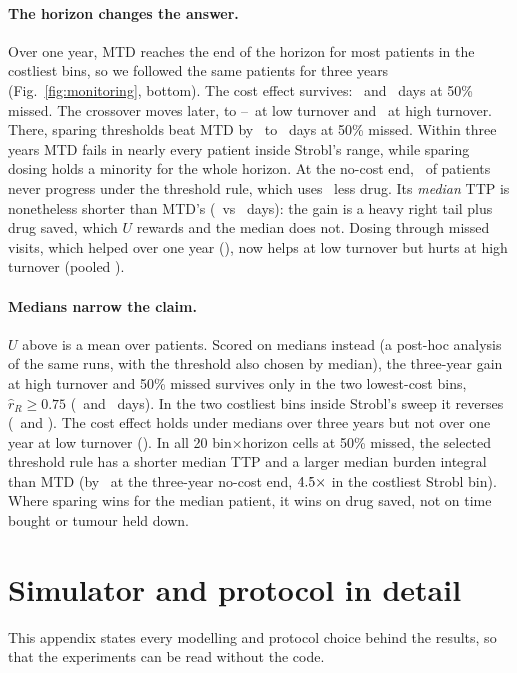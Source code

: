 \documentclass[10pt]{article}
\begin{document}
\paragraph{The horizon changes the answer.} Over one year, MTD reaches the end of
the horizon for most patients in the costliest bins, so we followed the same
patients for three years (Fig.~\ref{fig:monitoring}, bottom). The cost effect
survives: \MOneBCostLow\ and \MOneBCostHigh\ days at 50\% missed. The crossover
moves later, to \MOneBPStarLowMin--\MOneBPStarLowMax\ at low turnover and
\MOneBPStarHigh\ at high turnover. There, sparing thresholds beat MTD by
\MOneBHighMin\ to \MOneBHighMax\ days at 50\% missed. Within three years MTD
fails in nearly every patient inside Strobl's range, while sparing dosing holds
a minority for the whole horizon. At the no-cost end, \MOneBTailCens\ of
patients never progress under the threshold rule, which uses \MOneBExpCut\ less
drug. Its \emph{median} TTP is nonetheless shorter than MTD's (\MOneBMedThr\ vs
\MOneBMedMtd\ days): the gain is a heavy right tail plus drug saved, which $U$
rewards and the median does not. Dosing through missed visits, which helped
over one year (\MOneMiss), now helps at low turnover but hurts at high turnover
(pooled \MOneBMiss).

\paragraph{Medians narrow the claim.} $U$ above is a mean over patients. Scored
on medians instead (a post-hoc analysis of the same runs, with the threshold
also chosen by median), the three-year gain at high turnover and 50\% missed
survives only in the two lowest-cost bins, $\hat r_R \ge 0.75$ (\MOneCHighThree\
and \MOneCHighFour\ days). In the two costliest bins inside Strobl's sweep it
reverses (\MOneCHighOne\ and \MOneCHighTwo). The cost effect holds under medians
over three years but not over one year at low turnover (\MOneCCostOneLow). In
all 20 bin$\times$horizon cells at 50\% missed, the selected threshold rule has
a shorter median TTP and a larger median burden integral than MTD (by
\MOneCBurdenNoCost\ at the three-year no-cost end, $4.5\times$ in
the costliest Strobl bin). Where sparing wins for the median patient, it wins
on drug saved, not on time bought or tumour held down.


\section{Simulator and protocol in detail}\label{sec:methods}
This appendix states every modelling and protocol choice behind the results, so
that the experiments can be read without the code.
\end{document}
